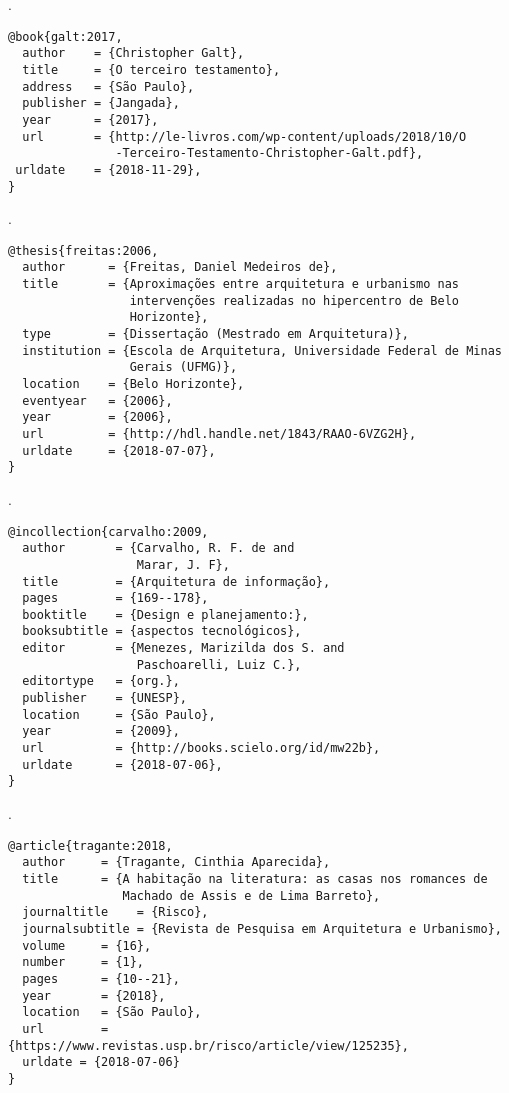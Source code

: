 \noindent
{}.

\vspace*{1em}

\begin{Verbatim}[frame=single]
@book{galt:2017,
  author    = {Christopher Galt},
  title     = {O terceiro testamento},
  address   = {São Paulo},
  publisher = {Jangada},
  year      = {2017},
  url       = {http://le-livros.com/wp-content/uploads/2018/10/O
               -Terceiro-Testamento-Christopher-Galt.pdf},
 urldate    = {2018-11-29},
}
\end{Verbatim}

\noindent
{}.

\vspace*{1em}

\begin{Verbatim}[frame=single]
@thesis{freitas:2006,
  author      = {Freitas, Daniel Medeiros de},
  title       = {Aproximações entre arquitetura e urbanismo nas
                 intervenções realizadas no hipercentro de Belo
                 Horizonte},
  type        = {Dissertação (Mestrado em Arquitetura)},
  institution = {Escola de Arquitetura, Universidade Federal de Minas
                 Gerais (UFMG)},
  location    = {Belo Horizonte},
  eventyear   = {2006},
  year        = {2006},
  url         = {http://hdl.handle.net/1843/RAAO-6VZG2H},
  urldate     = {2018-07-07},
}
\end{Verbatim}

\noindent
{}.

\vspace*{1em}

\begin{Verbatim}[frame=single]
@incollection{carvalho:2009,
  author       = {Carvalho, R. F. de and
                  Marar, J. F},
  title        = {Arquitetura de informação},
  pages        = {169--178},
  booktitle    = {Design e planejamento:},
  booksubtitle = {aspectos tecnológicos},
  editor       = {Menezes, Marizilda dos S. and
                  Paschoarelli, Luiz C.},
  editortype   = {org.},
  publisher    = {UNESP},
  location     = {São Paulo},
  year         = {2009},
  url          = {http://books.scielo.org/id/mw22b},
  urldate      = {2018-07-06},
}
\end{Verbatim}

\noindent
{}.

\vspace*{1em}

\begin{Verbatim}[frame=single]
@article{tragante:2018,
  author     = {Tragante, Cinthia Aparecida},
  title      = {A habitação na literatura: as casas nos romances de
                Machado de Assis e de Lima Barreto},
  journaltitle    = {Risco},
  journalsubtitle = {Revista de Pesquisa em Arquitetura e Urbanismo},
  volume     = {16},
  number     = {1},
  pages      = {10--21},
  year       = {2018},
  location   = {São Paulo},
  url        = {https://www.revistas.usp.br/risco/article/view/125235},
  urldate = {2018-07-06}
}
\end{Verbatim}

